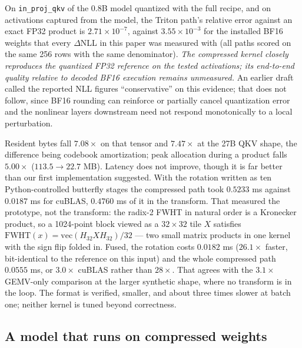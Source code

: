 \documentclass[11pt]{article}
\begin{document}
On \texttt{in\_proj\_qkv} of the 0.8B model quantized with the full recipe, and
on activations captured from the model, the Triton path's relative error
against an exact FP32 product is $2.71\times10^{-7}$, against
$3.55\times10^{-3}$ for the installed BF16 weights that every $\Delta$NLL in
this paper was measured with (all paths scored on the same 256 rows with the
same denominator). \emph{The compressed kernel closely reproduces the quantized
FP32 reference on the tested activations; its end-to-end quality relative to
decoded BF16 execution remains unmeasured.} An earlier draft called the reported
NLL figures ``conservative'' on this evidence; that does not follow, since BF16
rounding can reinforce or partially cancel quantization error and the nonlinear
layers downstream need not respond monotonically to a local perturbation.

Resident bytes fall $7.08\times$ on that tensor and $7.47\times$ at the 27B QKV
shape, the difference being codebook amortization; peak allocation during a
product falls $5.00\times$ ($113.5 \to 22.7$ MB). Latency does not improve, though it is far better than our first
implementation suggested. With the rotation written as ten Python-controlled
butterfly stages the compressed path took $0.5233$ ms against $0.0187$ ms for
cuBLAS, $0.4760$ ms of it in the transform. That measured the prototype, not the
transform: the radix-2 FWHT in natural order is a Kronecker product, so a
1024-point block viewed as a $32\times32$ tile $X$ satisfies
$\mathrm{FWHT}(x) = \mathrm{vec}(H_{32} X H_{32})/32$ --- two small matrix
products in one kernel with the sign flip folded in. Fused, the rotation costs
$0.0182$ ms ($26.1\times$ faster, bit-identical to the reference on this input)
and the whole compressed path $0.0555$ ms, or $\mathbf{3.0\times}$ cuBLAS rather
than $28\times$. That agrees with the $3.1\times$ GEMV-only comparison at the
larger synthetic shape, where no transform is in the loop. The format is
verified, smaller, and about three times slower at batch one; neither kernel is
tuned beyond correctness.

\subsection{A model that runs on compressed weights}
\end{document}
